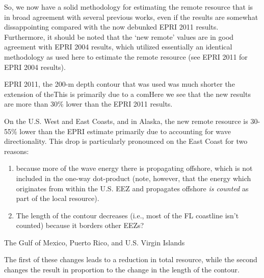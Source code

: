 So, we now have a solid methodology for estimating the remote resource that is in broad agreement with several previous works, even if the results are somewhat dissappointing compared with the now debunked EPRI 2011 results. Furthermore, it should be noted that the `new remote' values are in good agreement with EPRI 2004 results, which utilized essentially an identical methodology as used here to estimate the remote resource (see EPRI 2011 for EPRI 2004 results).


EPRI 2011, the 200-m depth contour that was used was much shorter the extension of theThis is primarily due to a comHere we see that the new results are more than 30\% lower than the EPRI 2011 results.

On the U.S. West and East Coasts, and in Alaska, the new remote resource is 30-55\% lower than the EPRI estimate primarily due to accounting for wave directionality. This drop is particularly pronounced on the East Coast for two reasons:
\begin{enumerate}
\item because more of the wave energy there is propagating offshore, which is not included in the one-way dot-product (note, however, that the energy which originates from within the U.S. EEZ and propagates offshore {\em is counted} as part of the local resource). 
\item The length of the contour decreases (i.e., most of the FL coastline isn't counted) because it borders other EEZs? 
\end{enumerate}
The Gulf of Mexico, Puerto Rico, and U.S. Virgin Islands 

 The first of these changes leads to a reduction in total resource, while the second changes the result in proportion to the change in the length of the contour.

